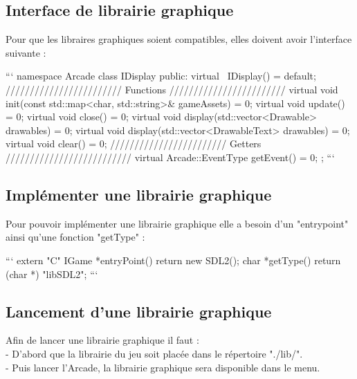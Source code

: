 \documentclass{report}
\begin{document}
\subsection{Interface de librairie graphique}

Pour que les libraires graphiques soient compatibles, elles doivent avoir l'interface suivante :

\begin{tcolorbox}[colback=black!75!white]
{\color{white}
\begin{markdown}
```
namespace Arcade {
    class IDisplay {
        public:
            virtual ~IDisplay() = default;
            //////////////////////// Functions ////////////////////////
            virtual void init(const std::map<char, std::string>& gameAssets) = 0;
            virtual void update() = 0;
            virtual void close() = 0;
            virtual void display(std::vector<Drawable> drawables) = 0;
            virtual void display(std::vector<DrawableText> drawables) = 0;
            virtual void clear() = 0;
            //////////////////////// Getters //////////////////////////
            virtual Arcade::EventType getEvent() = 0;
    };
}
```
\end{markdown}
}
\end{tcolorbox}

\subsection{Implémenter une librairie graphique}

Pour pouvoir implémenter une librairie graphique elle a besoin d'un "entrypoint" ainsi qu'une fonction "getType" :

\begin{tcolorbox}[colback=black!75!white]
{\color{white}
\begin{markdown}
```
extern "C" {
    IGame *entryPoint()
    {
        return new SDL2();
    }
    char *getType()
    {
        return (char *) "libSDL2";
    }
}
```
\end{markdown}
}
\end{tcolorbox}

\subsection{Lancement d'une librairie graphique}
Afin de lancer une librairie graphique il faut : \\
\hspace*{1cm}- D'abord que la librairie du jeu soit placée dans le répertoire "./lib/". \\
\hspace*{1cm}- Puis lancer l'Arcade, la librairie graphique sera disponible dans le menu. \\
\end{document}
